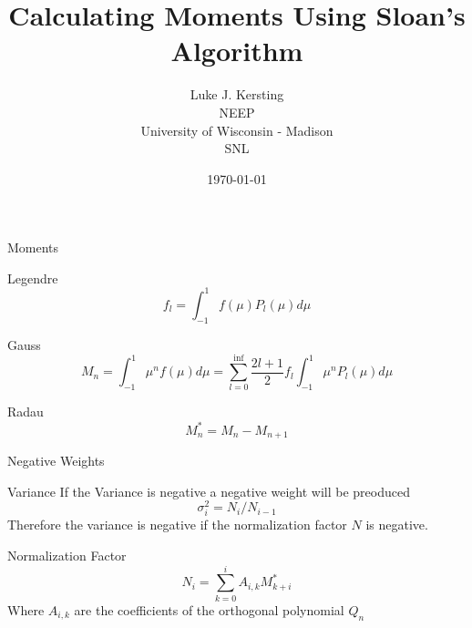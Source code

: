 \documentclass{beamer}
\author{Luke J. Kersting
    \\ NEEP
    \\ University of Wisconsin - Madison
    \\ SNL
}
\date{\today}
\title{Calculating Moments Using Sloan's Algorithm}
\begin{document}
\maketitle


\begin{frame}{Moments}

  \begin{block}{Legendre}
  \begin{equation*}
    f_l = \int_{-1}^{1}f(\mu)P_l(\mu)d\mu
  \end{equation*}
  \end{block}
    
  \begin{block}{Gauss}
  \begin{equation*}
    M_n = \int_{-1}^{1}\mu^nf(\mu)d\mu = \sum_{l=0}^{\inf}\frac{2l+1}{2}
    f_l\int_{-1}^{1}\mu^nP_l(\mu)d\mu
  \end{equation*}
  \end{block}

  \begin{block}{Radau}
  \begin{equation*}
    M^*_n = M_n - M_{n+1}
  \end{equation*}
  \end{block}
    

\end{frame}


\begin{frame}{Negative Weights}

\begin{block}{Variance}
  If the Variance is negative a negative weight will be preoduced
  \begin{equation*}
    \sigma^2_i = N_i/N_{i-1}
  \end{equation*}
  Therefore the variance is negative if the normalization factor $N$ is negative. \\
\end{block}

\begin{block}{Normalization Factor}
  \begin{equation*}
    N_i = \sum_{k=0}^{i} A_{i,k}M^*_{k+i}
  \end{equation*}
  Where $A_{i,k}$ are the coefficients of the orthogonal polynomial $Q_n$
\end{block}

\end{frame}
\end{document}
